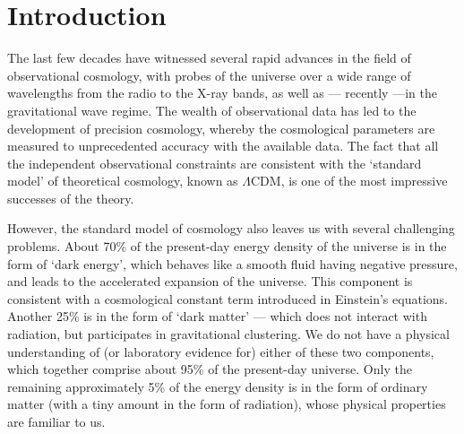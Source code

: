 
\section{Introduction}\label{s:intro}

The last few decades have witnessed several rapid advances in the field of observational cosmology, with  probes of the universe over a wide range of wavelengths from the radio to the X-ray bands, as well as — recently —in the gravitational wave regime. The wealth of observational data has led to the development of precision cosmology, whereby the cosmological parameters are measured to unprecedented accuracy with the available data. The fact that all the independent observational constraints are consistent with the `standard model' of theoretical cosmology, known as $\Lambda$CDM, is one of the most impressive successes of the theory. 

However, the standard model of cosmology also leaves us with several challenging problems. About 70\% of the present-day energy density of the universe is in the form of ‘dark energy’, which behaves like a smooth fluid having negative pressure, and leads to the accelerated expansion of the universe. This component is consistent with a cosmological constant term introduced in Einstein’s equations. Another 25\% is in the form of ‘dark matter’ — which does not interact with radiation, but participates in gravitational clustering. We do not have a physical understanding of (or laboratory evidence for) either of these two components, which together comprise about 95\% of the present-day universe. Only the remaining approximately 5\% of the energy density is in the form of ordinary matter (with a tiny amount in the form of radiation), whose physical properties are familiar to us. 

